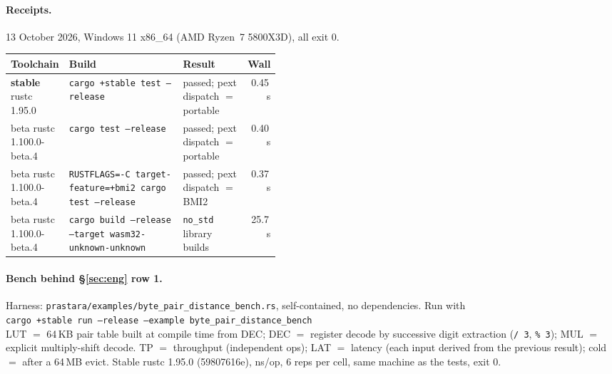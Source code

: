 \documentclass[11pt,letterpaper]{article}
\newcommand{\code}[1]{\texttt{#1}}
\theoremstyle{plain}
\theoremstyle{remark}
\begin{document}
\paragraph{Receipts.} 13 October 2026, Windows 11 x86\_64 (AMD Ryzen~7 5800X3D), all exit 0.

{\footnotesize\setlength{\tabcolsep}{4pt}
\noindent\begin{tabularx}{\linewidth}{@{}>{\raggedright\arraybackslash}p{0.2\linewidth}>{\raggedright\arraybackslash}X>{\raggedright\arraybackslash}p{0.24\linewidth}r@{}}
\toprule
\textbf{Toolchain} & \textbf{Build} & \textbf{Result} & \textbf{Wall}\\
\midrule
\textbf{stable} rustc 1.95.0 & \code{cargo +stable test --release} & 16 passed; pext dispatch $=$ portable & 0.45\,s\\
beta rustc 1.100.0-beta.4 & \code{cargo test --release} & 16 passed; pext dispatch $=$ portable & 0.40\,s\\
beta rustc 1.100.0-beta.4 & \code{RUSTFLAGS=-C target-feature=+bmi2 cargo test --release} & 16 passed; pext dispatch $=$ BMI2 & 0.37\,s\\
beta rustc 1.100.0-beta.4 & \code{cargo build --release --target wasm32-unknown-unknown} & \code{no\_std} library builds & 25.7\,s\\
\bottomrule
\end{tabularx}
}

\paragraph{Bench behind §\ref{sec:eng} row 1.} Harness: \code{prastara/examples/byte\_pair\_distance\_bench.rs}, self-contained, no dependencies. Run with\\[2pt]\hspace*{1.5em}\code{cargo +stable run --release --example byte\_pair\_distance\_bench}\\[2pt]LUT $=$ 64\,KB pair table built at compile time from DEC; DEC $=$ register decode by successive digit extraction (\code{/ 3}, \code{\% 3}); MUL $=$ explicit multiply-shift decode. TP $=$ throughput (independent ops); LAT $=$ latency (each input derived from the previous result); cold $=$ after a 64\,MB evict. Stable rustc 1.95.0 (59807616e), ns/op, 6 reps per cell, same machine as the tests, exit 0.
\end{document}
